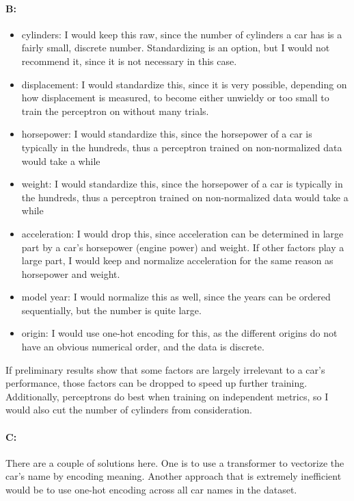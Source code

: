 \documentclass{article}
\begin{document}
\paragraph{B: }
\begin{itemize}
    \item cylinders: I would keep this raw, since the number of cylinders a car has is a fairly small, discrete number. Standardizing is an option, but I would not recommend it, since it is not necessary in this case.
    \item displacement: I would standardize this, since it is very possible, depending on how displacement is measured, to become either unwieldy or too small to train the perceptron on without many trials.
    \item horsepower: I would standardize this, since the horsepower of a car is typically in the hundreds, thus a perceptron trained on non-normalized data would take a while
    \item weight: I would standardize this, since the horsepower of a car is typically in the hundreds, thus a perceptron trained on non-normalized data would take a while
    \item acceleration: I would drop this, since acceleration can be determined in large part by a car's horsepower (engine power) and weight. If other factors play a large part, I would keep and normalize acceleration for the same reason as horsepower and weight.
    \item model year: I would normalize this as well, since the years can be ordered sequentially, but the number is quite large.
    \item origin: I would use one-hot encoding for this, as the different origins do not have an obvious numerical order, and the data is discrete.
\end{itemize}
If preliminary results show that some factors are largely irrelevant to a car's performance, those factors can be dropped to speed up further training. Additionally, perceptrons do best when training on independent metrics, so I would also cut the number of cylinders from consideration.

\paragraph{C: } There are a couple of solutions here. One is to use a transformer to vectorize the car's name by encoding meaning. Another approach that is extremely inefficient would be to use one-hot encoding across all car names in the dataset.
\end{document}
